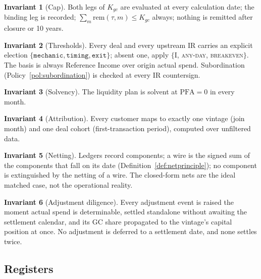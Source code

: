 \documentclass[11pt, a4paper]{article}
\theoremstyle{definition}
\newtheorem{invariant}{Invariant}
\newcommand{\PFA}{\mathrm{PFA}}                   %
\newcommand{\rem}{\mathrm{rem}}                   %
\newcommand{\Kgc}{K_{gc}}                         %
\newcommand{\param}[1]{\texttt{#1}}
\begin{document}
\begin{invariant}[Cap]\label{inv:cap}
Both legs of $\Kgc$ are evaluated at every calculation date; the binding leg is recorded; $\sum_m \rem(\tau, m) \leq \Kgc$ always; nothing is remitted after closure or 10 years.
\end{invariant}

\begin{invariant}[Thresholds]\label{inv:thresh}
Every deal and every upstream IR carries an explicit election $\{\param{mechanic}, \param{timing}, \param{exit}\}$; absent one, apply $\{$I, \textsc{any-day}, \textsc{breakeven}$\}$. The basis is always Reference Income over origin actual spend. Subordination (Policy~\ref{pol:subordination}) is checked at every IR countersign.
\end{invariant}

\begin{invariant}[Solvency]\label{inv:solv}
The liquidity plan is solvent at $\PFA = 0$ in every month.
\end{invariant}

\begin{invariant}[Attribution]\label{inv:attr}
Every customer maps to exactly one vintage (join month) and one deal cohort (first-transaction period), computed over unfiltered data.
\end{invariant}

\begin{invariant}[Netting]\label{inv:net}
Ledgers record components; a wire is the signed sum of the components that fall on its date (Definition~\ref{def:netprinciple}); no component is extinguished by the netting of a wire. The closed-form nets are the ideal matched case, not the operational reality.
\end{invariant}

\begin{invariant}[Adjustment diligence]\label{inv:adjust}
Every adjustment event is raised the moment actual spend is determinable, settled standalone without awaiting the settlement calendar, and its GC share propagated to the vintage's capital position at once. No adjustment is deferred to a settlement date, and none settles twice.
\end{invariant}

\subsection{Registers}
\end{document}
